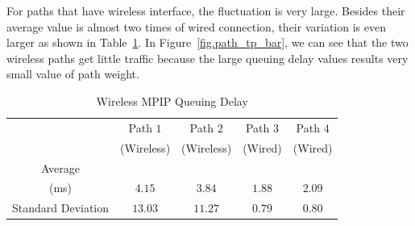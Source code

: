 

For paths that have wireless interface, the fluctuation is very large. Besides their average value is almost two times of wired connection, their variation is even larger as shown in Table~\ref{tb.wireless}. In Figure~\ref{fig.path_tp_bar}, we can see that the two wireless paths get little traffic because the large queuing delay values results very small value of path weight.


\begin{table}
\caption{\label{tb.wireless}Wireless MPIP Queuing Delay}
\centering
\begin{tabular}{|c|c|c|c|c|}
\hline
  & Path $1$   &  Path $2$   &  Path $3$ &  Path $4$\\
  & (Wireless) &  (Wireless) &  (Wired)  &  (Wired) \\
\hline
Average &   &   &   & \\
(ms) & $4.15$ & $3.84$ & $1.88$ & $2.09$ \\
\hline
Standard Deviation  & $13.03$ & $11.27$ & $0.79$ & $0.80$ \\
\hline
\end{tabular}
\end{table}

